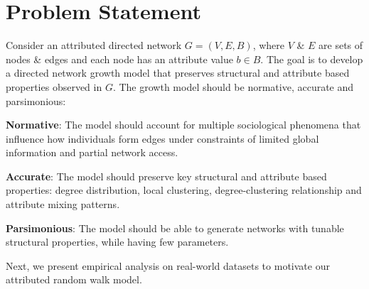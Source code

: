 
\section{Problem Statement}
\label{sec:Problem Statement}

Consider an attributed directed network $G=(V,E,B)$, where $V$ \& $E$ are
sets of nodes \& edges and each node has an attribute value $b \in B$.
The goal is to develop a directed network growth model that preserves structural
and attribute based properties observed in $G$. The growth model should be
normative, accurate and parsimonious:

\textbf{Normative}: The model should account for multiple sociological phenomena that influence how individuals form edges under constraints of limited global information and partial network access.

\textbf{Accurate}: The model should preserve key structural
and attribute based properties: degree distribution,
local clustering, degree-clustering relationship and attribute mixing patterns.

\textbf{Parsimonious}: The model should be able to
generate networks with tunable structural properties, while having few parameters.


Next, we present empirical analysis on real-world datasets to motivate our attributed random walk model.
